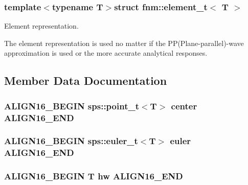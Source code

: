 \subsubsection*{template$<$typename T$>$struct fnm\+::element\+\_\+t$<$ T $>$}

Element representation. 

The element representation is used no matter if the P\+P(Plane-\/parallel)-\/wave approximation is used or the more accurate analytical responses. 

\subsection{Member Data Documentation}
\hypertarget{structfnm_1_1element__t_a1320f8d1d8db5d6492829bb545e52819}{
\subsubsection[{A\+L\+I\+G\+N16\+\_\+\+E\+N\+D}]{\setlength{\rightskip}{0pt plus 5cm}A\+L\+I\+G\+N16\+\_\+\+B\+E\+G\+I\+N sps\+::point\+\_\+t$<$T$>$ center A\+L\+I\+G\+N16\+\_\+\+E\+N\+D}}\label{structfnm_1_1element__t_a1320f8d1d8db5d6492829bb545e52819}
\hypertarget{structfnm_1_1element__t_abb6cbad93f868c1374b91cbef203e31a}{
\subsubsection[{A\+L\+I\+G\+N16\+\_\+\+E\+N\+D}]{\setlength{\rightskip}{0pt plus 5cm}A\+L\+I\+G\+N16\+\_\+\+B\+E\+G\+I\+N sps\+::euler\+\_\+t$<$T$>$ euler A\+L\+I\+G\+N16\+\_\+\+E\+N\+D}}\label{structfnm_1_1element__t_abb6cbad93f868c1374b91cbef203e31a}
\hypertarget{structfnm_1_1element__t_ab091fbc55910c6b961a1dd5c69b7076a}{
\subsubsection[{A\+L\+I\+G\+N16\+\_\+\+E\+N\+D}]{\setlength{\rightskip}{0pt plus 5cm}A\+L\+I\+G\+N16\+\_\+\+B\+E\+G\+I\+N T hw A\+L\+I\+G\+N16\+\_\+\+E\+N\+D}}\label{structfnm_1_1element__t_ab091fbc55910c6b961a1dd5c69b7076a}


